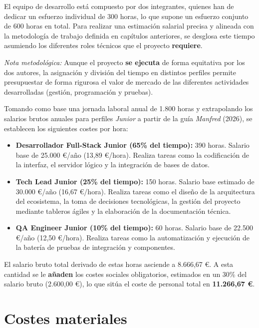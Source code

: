 El equipo de desarrollo está compuesto por dos integrantes, quienes han de dedicar un esfuerzo individual de 300 horas, lo que supone un esfuerzo conjunto de 600 horas en total. Para realizar una estimación salarial precisa y alineada con la metodología de trabajo definida en capítulos anteriores, se desglosa este tiempo asumiendo los diferentes roles técnicos que el proyecto \textbf{requiere}.

\textit{Nota metodológica:} Aunque el proyecto \textbf{se ejecuta} de forma equitativa por los dos autores, la asignación y división del tiempo en distintos perfiles permite presupuestar de forma rigurosa el valor de mercado de las diferentes actividades desarrolladas (gestión, programación y pruebas).

Tomando como base una jornada laboral anual de 1.800 horas y extrapolando los salarios brutos anuales para perfiles \textit{Junior} a partir de la guía \textit{Manfred} (2026), se establecen los siguientes costes por hora:
\begin{itemize}
    \item \textbf{Desarrollador Full-Stack Junior (65\% del tiempo):} 390 horas. Salario base de 25.000 \euro/año (13,89 \euro/hora). Realiza tareas como la codificación de la interfaz, el servidor lógico y la integración de bases de datos.
    \item \textbf{Tech Lead Junior (25\% del tiempo):} 150 horas. Salario base estimado de 30.000 \euro/año (16,67 \euro/hora). Realiza tareas como el diseño de la arquitectura del ecosistema, la toma de decisiones tecnológicas, la gestión del proyecto mediante tableros ágiles y la elaboración de la documentación técnica.
    \item \textbf{QA Engineer Junior (10\% del tiempo):} 60 horas. Salario base de 22.500 \euro/año (12,50 \euro/hora). Realiza tareas como la automatización y ejecución de la batería de pruebas de integración y componentes.
\end{itemize}

El salario bruto total derivado de estas horas asciende a 8.666,67 \euro. A esta cantidad se le \textbf{añaden} los costes sociales obligatorios, estimados en un 30\% del salario bruto (2.600,00 \euro), lo que sitúa el coste de personal total en \textbf{11.266,67 \euro}.

\section{Costes materiales}

